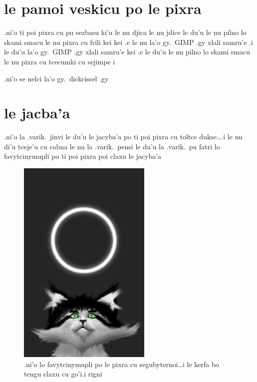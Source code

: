 \documentclass{report}
\begin{document}
\section{le pamoi veskicu po le pixra}
.ni'o ti poi pixra cu pu sezbasu ki'u le nu djica le nu jdice le du'u le nu pilno lo skami smacu le nu pixra cu frili kei kei .e le nu la'o gy.\ GIMP .gy xlali samru'e \@ .i le du'u la'o gy.\ GIMP .gy xlali samru'e kei .e le du'u le nu pilno lo skami smacu le nu pixra cu tcecumki cu sejimpe                                                     i

.ni'o se nelci la'o gy.\ dickcissel .gy
\section{le jacba'a}
.ni'o la .varik.\ jinvi le du'u le jacyba'a po ti poi pixra cu toltce dukse\ldots\@ .i le nu di'u tceje'u cu cabna le nu la .varik.\ pensi le du'u la .varik.\ pu fatri lo favytcinymupli po ti poi pixra poi claxu le jacyba'a
\begin{figure}[ht]
	\centering
	\includegraphics[height=10cm]{20200414042645-03/20200414042645-03-uw.png}
	\caption[center]{.ni'o lo favytcinymupli po le pixra cu segubyternoi\ldots i le kerfa bo tengu claxu cu go'i\@  .i rigni}
\end{figure}
\end{document}
